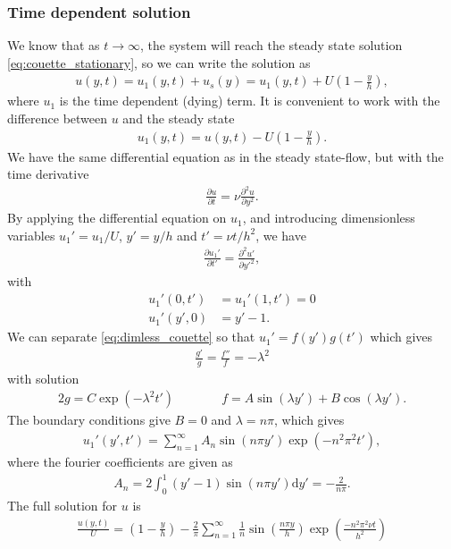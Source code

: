 \documentclass[a4paper,10pt]{article}
\renewcommand{\(}{\left(}
\renewcommand{\)}{\right)}
\newcommand{\dm}[1]{\text{d}#1}
\newcommand{\dpart}[2]{\frac{\partial#1}{\partial#2}}
\newcommand{\dpartt}[2]{\frac{\partial^2#1}{\partial#2^2}}
\begin{document}
\subsubsection{Time dependent solution}
We know that as $t\rightarrow\infty$, the system will reach the steady state solution \eqref{eq:couette_stationary}, so we can write the solution as
\begin{align*}
  u(y,t) = u_1(y,t) + u_s(y) = u_1(y,t) + U\left(1 - \frac{y}{h}\right),
\end{align*}
where $u_1$ is the time dependent (dying) term. It is convenient to work with the difference between $u$ and the steady state
\begin{align*}
  u_1(y,t) = u(y,t) - U\left(1 - \frac{y}{h}\right).
\end{align*}
We have the same differential equation as in the steady state-flow, but with the time derivative
\begin{align*}
  \dpart{u}{t} = \nu\dpartt{u}{y}.
\end{align*}
By applying the differential equation on $u_1$, and introducing dimensionless variables $u_1' = u_1/U$, $y' = y/h$ and $t' = \nu t/h^2$, we have
\begin{align}
  \label{eq:dimless_couette}
  \dpart{u_1'}{t'} = \dpartt{u'}{y'},
\end{align}
with 
\begin{align*}
  u_1'(0,t') &= u_1'(1,t') = 0\\
  u_1'(y',0) &= y' - 1.
\end{align*}
We can separate \eqref{eq:dimless_couette} so that $u_1' = f(y')g(t')$ which gives
\begin{align*}
  \frac{g'}{g} = \frac{f''}{f} = -\lambda^2
\end{align*}
with solution
\begin{alignat*}{2}
  g = C\exp(-\lambda^2t') & \qquad\quad f = A\sin(\lambda y') + B\cos(\lambda y').
\end{alignat*}
The boundary conditions give $B=0$ and $\lambda=n\pi$, which gives
\begin{align*}
  u_1'(y',t') = \sum_{n=1}^\infty A_n \sin\left(n\pi y'\right)\exp\left(-n^2\pi^2t'\right),
\end{align*}
where the fourier coefficients are given as
\begin{align*}
  A_n = 2\int_{0}^1 (y' - 1)\sin\left(n\pi y'\right) \dm y' = -\frac{2}{n\pi}.
\end{align*}
The full solution for $u$ is
\begin{align}
  \frac{u(y,t)}{U} = \left(1 - \frac{y}{h}\right) - \frac{2}{\pi}\sum_{n=1}^\infty \frac{1}{n} \sin\left(\frac{n\pi y}{h}\right)\exp\left(\frac{-n^2\pi^2 \nu t}{h^2}\right)
\end{align}
\end{document}
